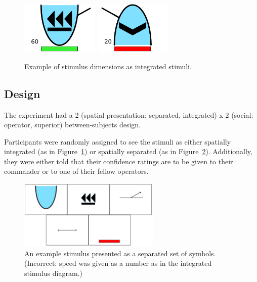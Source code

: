 \documentclass[doc, a4paper, apacite]{apa6}
\begin{document}
\begin{figure}[b]
	\centering
	\includegraphics[width=0.33\textwidth]{images/integratedStimulusExample}
	\includegraphics[width=0.33\textwidth]{images/integratedStimulusExample2}
	\caption{Example of stimulus dimensions as integrated stimuli.}
	\label{fig:integratedStimuli}
\end{figure}

\subsection{Design}
The experiment had a 2 (spatial presentation: separated, integrated) x 2 (social: operator, superior) between-subjects design. 

Participants were randomly assigned to see the stimuli as either spatially integrated (as in Figure~\ref{fig:integratedStimuli}) or spatially separated (as in Figure~\ref{fig:separatedStimulus}). 
Additionally, they were either told that their confidence ratings are to be given to their commander or to one of their fellow operators. 

\begin{figure}[t]
	\centering	
	\includegraphics[width=0.6\textwidth]{images/separatedStimulusExample}
	\caption{An example stimulus presented as a separated set of symbols. (Incorrect: speed was given as a number as in the integrated stimulus diagram.)}
	\label{fig:separatedStimulus}	
\end{figure}
\end{document}
